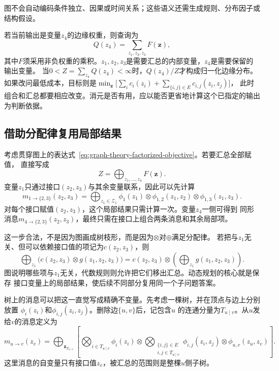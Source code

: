 图不会自动编码条件独立、因果或时间关系；这些语义还需生成规则、分布因子或结构假设。

若当前输出是变量\(z_4\)的边缘权重，则查询为
\[
  Q(z_4)=\sum_{z_1,z_2,z_3}F(\bm z),
\]
其中\(F\)须采用非负权重的乘积。\(z_1,z_2,z_3\)是需要汇总的内部变量，\(z_4\)是需要保留的输出变量。
当\(0<Z=\sum_{z_4}Q(z_4)<\infty\)时，\(Q(z_4)/Z\)才构成归一化边缘分布。
如果改问最低成本，目标则是\(\min_{\bm z}\bigl[\sum_i c_i(z_i)+\sum_{\{i,j\}\in E}c_{i,j}(z_i,z_j)\bigr]\)，
此时组合和汇总都要相应改变。消元是否有用，应以能否更省地计算这个已指定的输出为判断依据。

\subsection{借助分配律复用局部结果}

考虑贯穿图上的表达式~\eqref{eq:graph-theory-factorized-objective}。若要汇总全部赋值，
直接写成
\[
  Z=\bigoplus_{z_1,\ldots,z_4}F(\bm{z}).
\]
变量\(z_1\)只通过接口\((z_2,z_3)\)与其余变量联系，因此可以先计算
\begin{equation}
  m_{1\to\{2,3\}}(z_2,z_3)=
  \bigoplus_{z_1\in\mathcal{Z}_1}
  \phi_1(z_1)\otimes
  \phi_{1,2}(z_1,z_2)\otimes\phi_{1,3}(z_1,z_3).
  \label{eq:graph-theory-interface-message}
\end{equation}
对每个接口赋值\((z_2,z_3)\)，这个局部结果只需计算一次。变量\(z_4\)一侧可得到
同形消息\(m_{4\to\{2,3\}}(z_2,z_3)\)，最终只需在接口上组合两条消息和其余局部项。

这一步合法，不是因为图画成树枝形，而是因为\(\otimes\)对\(\oplus\)满足分配律。
若把与\(z_1\)无关、但可以依赖接口值的项记为\(c(z_2,z_3)\)，则
\[
  \bigoplus_{z_1}\bigl(c(z_2,z_3)\otimes g(z_1,z_2,z_3)\bigr)
  =c(z_2,z_3)\otimes\left(\bigoplus_{z_1}g(z_1,z_2,z_3)\right).
\]
图说明哪些项与\(z_1\)无关，代数规则则允许把它们移出汇总。动态规划的核心就是保存
接口变量上的局部结果，使后续不同部分复用同一个子问题答案。

树上的消息可以把这一直觉写成精确不变量。先考虑一棵树，并在顶点与边上分别放置
\(\phi_i(z_i)\)和\(\phi_{i,j}(z_i,z_j)\)。删除边\(\{u,v\}\)后，记包含\(u\)
的连通分量为\(T_{u\mid v}\)。从\(u\)发给\(v\)的消息定义为
\begin{equation}
  m_{u\to v}(z_v)=
  \bigoplus_{\bm{z}_{T_{u\mid v}}}
  \left[
    \bigotimes_{i\in T_{u\mid v}}\phi_i(z_i)
    \otimes
    \bigotimes_{\substack{\{i,j\}\in E\\i,j\in T_{u\mid v}}}
      \phi_{i,j}(z_i,z_j)
    \otimes\phi_{u,v}(z_u,z_v)
  \right].
  \label{eq:graph-theory-tree-message-semantics}
\end{equation}
这里消息的自变量只有接口值\(z_v\)，被汇总的范围则是整棵\(u\)侧子树。

